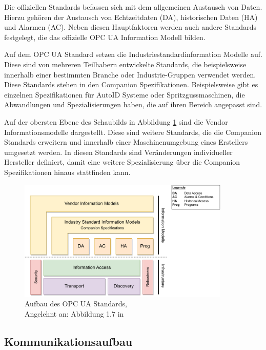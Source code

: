 \documentclass[a4paper, 12pt, oneside]{scrbook}
\begin{document}
		Die offiziellen Standards befassen sich mit dem allgemeinen Austausch von Daten. Hierzu gehören der Austausch von Echtzeitdaten (DA), historischen Daten (HA) und Alarmen (AC). Neben diesen Hauptfaktoren werden auch andere Standards festgelegt, die das offizielle OPC UA Information Modell bilden. \cite{mahnke_opc_2009, rinke_was_2022}
		
		Auf dem OPC UA Standard setzen die Industriestandardinformation Modelle auf. Diese sind von mehreren Teilhabern entwickelte Standards, die beispielsweise innerhalb einer bestimmten Branche oder Industrie-Gruppen verwendet werden. Diese Standards stehen in den Companion Spezifikationen. Beispielsweise gibt es einzelnen Spezifikationen für AutoID Systeme oder Spritzgussmaschinen, die Abwandlungen und Spezialisierungen haben, die auf ihren Bereich angepasst sind. \cite{mahnke_opc_2009, rinke_was_2022}
		
		Auf der obersten Ebene des Schaubilds in Abbildung \ref{fig:OPCUA_Framework} sind die Vendor Informationsmodelle dargestellt. Diese sind weitere Standards, die die Companion Standards erweitern und innerhalb einer Maschinenumgebung eines Erstellers umgesetzt werden. In diesen Standards sind Veränderungen individueller Hersteller definiert, damit eine weitere Spezialisierung über die Companion Spezifikationen hinaus stattfinden kann. \cite{mahnke_opc_2009, rinke_was_2022}
		
		
		\begin{figure}[H]
			\centering
			\includegraphics[width=0.9\textwidth]{res/diagramms/companionSpezifikations.pdf}
			\caption{Aufbau des OPC UA Standards, \\ Angelehnt an: Abbildung 1.7 in \cite{mahnke_opc_2009}} %
			\label{fig:OPCUA_Framework}
		\end{figure}
	
		\subsection{Kommunikationsaufbau} %
		
\end{document}
